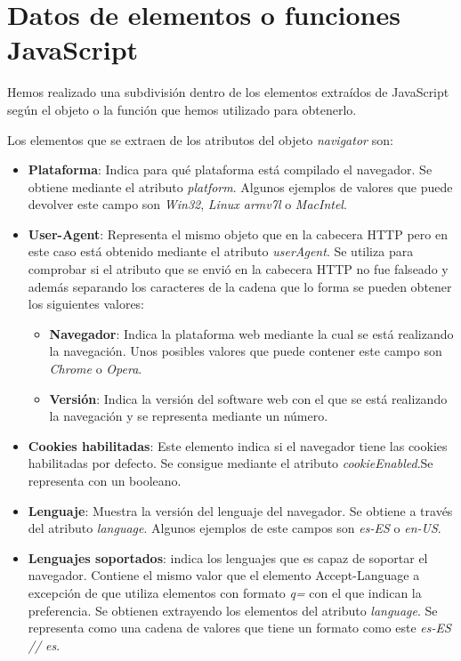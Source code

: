 \section{Datos de elementos o funciones JavaScript}
 Hemos realizado una subdivisión dentro de los elementos extraídos de JavaScript según el objeto o la función que hemos utilizado para obtenerlo.\par
\noindent Los elementos que se extraen de los atributos del objeto \textit{navigator}\cite{navigator} son:
\begin{itemize}
    \item \textbf{Plataforma}: Indica para qué plataforma está compilado el navegador. Se obtiene mediante el atributo \textit{platform}. Algunos ejemplos de valores que puede devolver este campo son \textit{Win32}, \textit{Linux armv7l} o \textit{MacIntel}.
    \item \textbf{User-Agent}: Representa el mismo objeto que en la cabecera HTTP pero en este caso está obtenido mediante el atributo \textit{userAgent}. Se utiliza para comprobar si el atributo que se envió en la cabecera HTTP no fue falseado y además separando los caracteres  de la cadena que lo forma se pueden obtener los siguientes valores:
    \begin{itemize}
        \item \textbf{Navegador}: Indica la plataforma web mediante la cual se está realizando la navegación. Unos posibles valores que puede contener este campo son \textit{Chrome} o \textit{Opera}.
        \item \textbf{Versión}: Indica la versión del software web con el que se está realizando la navegación y se representa mediante un número.
    \end{itemize}
    \item \textbf{Cookies habilitadas}: Este elemento indica si el navegador tiene las cookies habilitadas por defecto. Se consigue mediante el atributo \textit{cookieEnabled}.Se representa con un booleano.
    \item \textbf{Lenguaje}: Muestra la versión del lenguaje del navegador. Se obtiene a través del atributo \textit{language}. Algunos ejemplos de este campos son \textit{es-ES} o \textit{en-US}.
    \item \textbf{Lenguajes soportados}: indica los lenguajes que es capaz de soportar el navegador. Contiene el mismo valor que el elemento Accept-Language a excepción de que utiliza elementos con formato \textit{q=} con el que indican la preferencia. Se obtienen extrayendo los elementos del atributo \textit{language}. Se representa como una cadena de valores que tiene un formato como este \textit{es-ES // es}.

\end{itemize}
